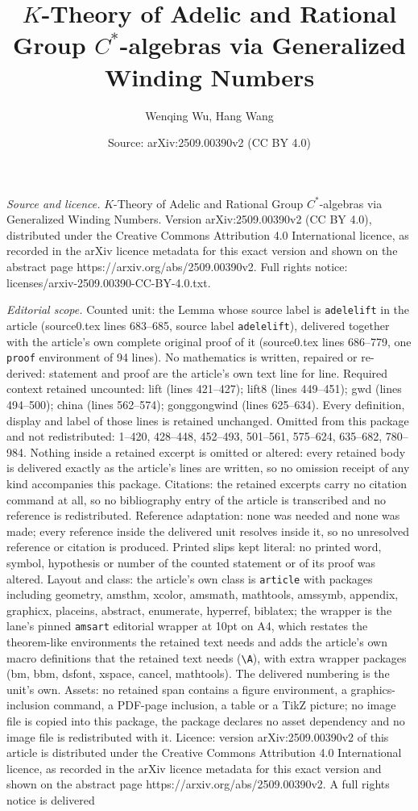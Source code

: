 \documentclass[10pt,a4paper]{amsart}
\title[$K$-Theory of Adelic and Rational Group $C^*$-algebras via G]{$K$-Theory of Adelic and Rational Group $C^*$-algebras via Generalized Winding Numbers}
\author{Wenqing Wu, Hang Wang}
\date{Source: arXiv:2509.00390v2 (CC BY 4.0)}
\begin{document}
\maketitle

\noindent\emph{Source and licence.} $K$-Theory of Adelic and Rational Group $C^*$-algebras via Generalized Winding Numbers. Version arXiv:2509.00390v2 (CC BY 4.0), distributed under the Creative Commons Attribution 4.0 International licence, as recorded in the arXiv licence metadata for this exact version and shown on the abstract page https://arxiv.org/abs/2509.00390v2. Full rights notice: licenses/arxiv-2509.00390-CC-BY-4.0.txt.\par\smallskip

\noindent\textit{Editorial scope.} Counted unit: the Lemma whose source label is \texttt{adelelift} in the article (source0.tex lines 683--685, source label \texttt{adelelift}), delivered together with the article's own complete original proof of it (source0.tex lines 686--779, one \texttt{proof} environment of 94 lines). No mathematics is written, repaired or re-derived: statement and proof are the article's own text line for line. Required context retained uncounted: lift (lines 421--427); lift8 (lines 449--451); gwd (lines 494--500); china (lines 562--574); gonggongwind (lines 625--634). Every definition, display and label of those lines is retained unchanged. Omitted from this package and not redistributed: 1--420, 428--448, 452--493, 501--561, 575--624, 635--682, 780--984. Nothing inside a retained excerpt is omitted or altered: every retained body is delivered exactly as the article's lines are written, so no omission receipt of any kind accompanies this package. Citations: the retained excerpts carry no citation command at all, so no bibliography entry of the article is transcribed and no reference is redistributed. Reference adaptation: none was needed and none was made; every reference inside the delivered unit resolves inside it, so no unresolved reference or citation is produced. Printed slips kept literal: no printed word, symbol, hypothesis or number of the counted statement or of its proof was altered. Layout and class: the article's own class is \texttt{article} with packages including geometry, amsthm, xcolor, amsmath, mathtools, amssymb, appendix, graphicx, placeins, abstract, enumerate, hyperref, biblatex; the wrapper is the lane's pinned \texttt{amsart} editorial wrapper at 10pt on A4, which restates the theorem-like environments the retained text needs and adds the article's own macro definitions that the retained text needs (\texttt{\textbackslash A}), with extra wrapper packages (bm, bbm, dsfont, xspace, cancel, mathtools). The delivered numbering is the unit's own. Assets: no retained span contains a figure environment, a graphics-inclusion command, a PDF-page inclusion, a table or a TikZ picture; no image file is copied into this package, the package declares no asset dependency and no image file is redistributed with it. Licence: version arXiv:2509.00390v2 of this article is distributed under the Creative Commons Attribution 4.0 International licence, as recorded in the arXiv licence metadata for this exact version and shown on the abstract page https://arxiv.org/abs/2509.00390v2. A full rights notice is delivered 
\end{document}
